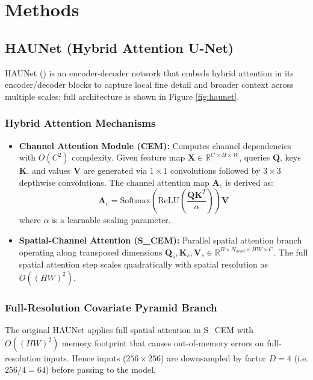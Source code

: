 \documentclass[a4paper, 11pt]{article} %
\begin{document}
\section{Methods}

\subsection{HAUNet (Hybrid Attention U-Net)}
HAUNet (\cite{wangHybridAttentionBasedUShaped2023}) is an encoder-decoder network that embeds hybrid attention in its encoder/decoder blocks to capture local fine detail and broader context across multiple scales; full architecture is shown in Figure \ref{fig:haunet}.

\subsubsection{Hybrid Attention Mechanisms}
\begin{itemize}
    \item \textbf{Channel Attention Module (CEM):} Computes channel dependencies with $O(C^2)$ complexity. Given feature map $\mathbf{X} \in \mathbb{R}^{C \times H \times W}$, queries $\mathbf{Q}$, keys $\mathbf{K}$, and values $\mathbf{V}$ are generated via $1 \times 1$ convolutions followed by $3 \times 3$ depthwise convolutions. The channel attention map $\mathbf{A}_c$ is derived as:
    \begin{equation}
        \mathbf{A}_c = \text{Softmax}\left(\text{ReLU}\left(\frac{\mathbf{Q} \mathbf{K}^T}{\alpha}\right)\right) \mathbf{V}
    \end{equation}
    where $\alpha$ is a learnable scaling parameter.
    
    \item \textbf{Spatial-Channel Attention (S\_CEM):} Parallel spatial attention branch operating along transposed dimensions $\mathbf{Q}_s, \mathbf{K}_s, \mathbf{V}_s \in \mathbb{R}^{B \times N_{head} \times HW \times C}$. The full spatial attention step scales quadratically with spatial resolution as $O((HW)^2)$.
\end{itemize}

\subsubsection{Full-Resolution Covariate Pyramid Branch}
The original \cite{wangHybridAttentionBasedUShaped2023} HAUNet applies full spatial attention in S\_CEM with $O((HW)^2)$ memory footprint that causes out-of-memory errors on full-resolution inputs. Hence inputs ($256 \times 256$) are downsampled by factor $D=4$ (i.e. $256/4 = 64$) before passing to the model.
\end{document}
